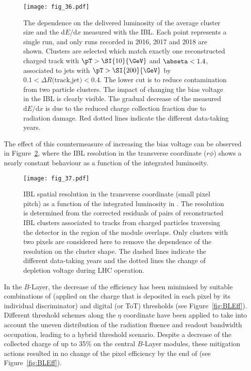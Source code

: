\documentclass[cernpreprint, atlasdraft=false, UKenglish,british,orcidlogo, texmf, orcidlogo]{atlasdoc}
\begin{document}
\begin{figure}[ht!]
\begin{center}
\texttt{[image: fig\_36.pdf]}
\end{center}
\caption{The dependence on the delivered luminosity of the average cluster size and the ${\text{d}}E/{\text{d}}x$ measured with the \gls{IBL}. Each point represents a single run, and only runs recorded in 2016, 2017 and 2018 are shown. Clusters are selected which match exactly one reconstructed charged track with $\pT>\SI{10}{\GeV}$ and $\abseta<1.4$, associated to jets with $\pT>\SI{200}{\GeV}$ by $0.1<\Delta R\text{(track,jet)}<0.4$. The lower cut is to reduce contamination from two particle clusters. The impact of changing the bias voltage in the \gls{IBL} is clearly visible. The gradual decrease of the measured ${\text{d}}E/{\text{d}}x$ is due to the reduced charge collection fraction due to radiation damage. Red dotted lines indicate the different data-taking years.
\label{fig:IBLdEdx}}
\end{figure}
 
The effect of this countermeasure of increasing the bias voltage can be observed in Figure~\ref{fig:IBLResX}, where the \gls{IBL} resolution in the transverse coordinate ($r\phi$) shows a nearly constant behaviour as a function of the integrated luminosity.
 
\begin{figure}[ht!]
\begin{center}
\texttt{[image: fig\_37.pdf]}
\end{center}
\caption{\gls{IBL} spatial resolution in the transverse coordinate (small pixel pitch) as a function of the integrated luminosity in \RunTwo. The resolution is determined from the corrected residuals of pairs of reconstructed \gls{IBL} clusters associated to tracks from charged particles traversing the detector in the region of the module overlaps. Only clusters with two pixels are considered here to remove the dependence of the resolution on the cluster shape. The dashed lines indicate the different data-taking years and the dotted lines the change of depletion voltage during \gls{LHC} operation. \label{fig:IBLResX}}
\end{figure}
 
In the $B$-Layer, the decrease of the efficiency has been minimised by suitable combinations of \analog (applied on the charge that is deposited in each pixel by its individual discriminator) and digital (or \gls{ToT}) thresholds (see Figure~\ref{fig:BLEff}). Different threshold schemes along the $\eta$ coordinate have been applied to take into account the uneven distribution of the radiation fluence and readout bandwidth occupation, leading to a hybrid threshold scenario. Despite a decrease of the collected charge of up to 35\% on the central $B$-Layer modules, these mitigation actions resulted in no change of the pixel efficiency by the end of \RunTwo (see Figure~\ref{fig:BLEff}).
 
\end{document}
